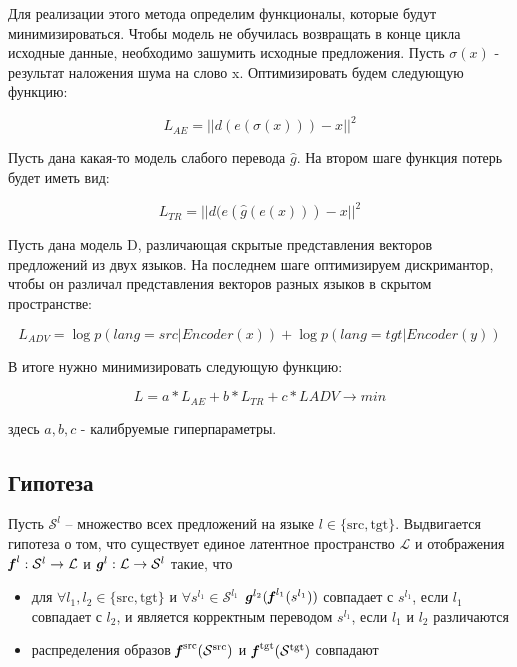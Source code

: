 \documentclass[12pt,twoside]{article}
\begin{document}
    Для реализации этого метода определим функционалы, которые будут минимизироваться. Чтобы модель не обучилась возвращать в конце цикла исходные данные, необходимо зашумить исходные предложения. Пусть $\sigma(x)$ - результат наложения шума на слово x.  Оптимизировать будем  следующую функцию:

    $$L_{AE} = ||d(e(\sigma(x)))-x||^2$$

    Пусть дана какая-то модель слабого перевода $\hat{g}$. На втором шаге  функция потерь будет иметь вид:

    $$L_{TR} = ||d(e(\hat{g}(e(x))) - x||^2$$

    Пусть дана модель D, различающая скрытые представления векторов предложений из двух языков. На последнем шаге оптимизируем дискримантор, чтобы он различал представления векторов разных языков в скрытом пространстве:

    $$L_{ADV} = \log p(lang = src| Encoder(x)) + \log p(lang = tgt|Encoder(y))$$

    В итоге нужно минимизировать следующую функцию:

    $$L = a*L_{AE} + b*L_{TR}+c*L{ADV} \longrightarrow min$$

    здесь $a,b,c$ - калибруемые гиперпараметры.

\subsection{Гипотеза}
   Пусть $\mathcal{S}^{l}$ -- множество всех предложений на языке $l \in \{\text{src}, \text{tgt}\}$. Выдвигается гипотеза о том, что существует единое латентное пространство $\mathcal{L}$ и отображения $\textbf{\textit{f}}^{l}: \mathcal{S}^{l} \to \mathcal{L}$ и $\textbf{\textit{g}}^{l}: \mathcal{L} \to \mathcal{S}^{l}$ такие, что
   \begin{itemize}
      \item для $\forall l_1, l_2 \in \{\text{src}, \text{tgt}\}$ и $\forall s^{l_1} \in \mathcal{S}^{l_1}$ $\textbf{\textit{g}}^{l_2}(\textbf{\textit{f}}^{l_1}(s^{l_1}))$ совпадает с $s^{l_1}$, если $l_1$ совпадает с $l_2$, и является корректным переводом $s^{l_1}$, если $l_1$ и $l_2$ различаются


      \item распределения образов $\textbf{\textit{f}}^{\text{src}}(\mathcal{S}^{\text{src}})$ и $\textbf{\textit{f}}^{\text{tgt}}(\mathcal{S}^{\text{tgt}})$ совпадают
   \end{itemize}
\end{document}
